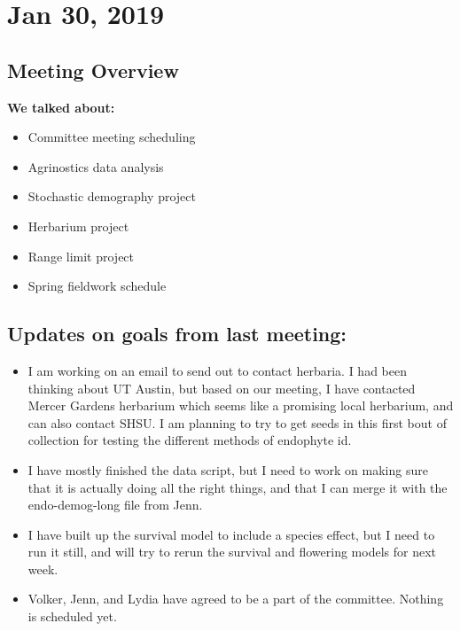 \documentclass{article}
\newcommand{\tom}[1]{{\textit{\color{WildStrawberry}{[#1]}}}}
\begin{document}
\section*{Jan 30, 2019}
\subsection*{Meeting Overview}
\textbf{We talked about:}
\begin{itemize}
\item{Committee meeting scheduling}
\item{Agrinostics data analysis}
\item{Stochastic demography project}
\item{Herbarium project}
\item{Range limit project}
\item{Spring fieldwork schedule}
\end{itemize}

\subsection*{Updates on goals from last meeting:}
\begin{itemize}
\item{I am working on an email to send out to contact herbaria. I had been thinking about UT Austin, but based on our meeting, I have contacted Mercer Gardens herbarium which seems like a promising local herbarium, and can also contact SHSU. I am planning to try to get seeds in this first bout of collection for testing the different methods of endophyte id.\tom{I saw in your email that you also intend to get tiller tissue, so it would be good to have a plan for what you will do with it.}}
\item{I have mostly finished the data script, but I need to work on making sure that it is actually doing all the right things, and that I can merge it with the endo-demog-long file from Jenn.}
\item{I have built up the survival model to include a species effect, but I need to run it still, and will try to rerun the survival and flowering models for next week.}
\item{Volker, Jenn, and Lydia have agreed to be a part of the committee. Nothing is scheduled yet.}
\end{itemize}
\end{document}
